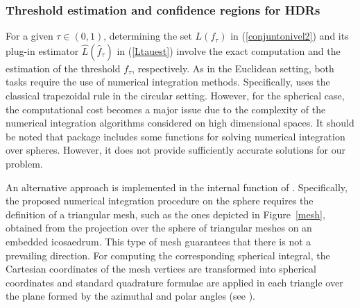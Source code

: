 \subsubsection{Threshold estimation and confidence regions for HDRs}\label{threshold}



For a given $\tau\in (0,1)$, determining the set $L(f_\tau)$ in (\ref{conjuntonivel2}) and its plug-in estimator $\hat{L}(\hat{f}_{\tau})$ in (\ref{Ltauest}) involve the exact computation and the estimation of the threshold $f_\tau$, respectively. As in the Euclidean setting, both tasks require the use of numerical integration methods. Specifically,  uses the classical trapezoidal rule in the circular setting. However, for the spherical case, the computational cost becomes a major issue due to the complexity of the numerical integration algorithms considered on high dimensional spaces. It should be noted that package  includes some functions for solving numerical integration over spheres. However, it does not provide sufficiently accurate solutions for our problem. 

An alternative approach is implemented in the internal function  of . Specifically, the proposed numerical integration procedure on the sphere requires the definition of a triangular mesh, such as the ones depicted in Figure~\ref{mesh}, obtained from the projection over the sphere of triangular meshes on an embedded icosaedrum. This type of mesh guarantees that there is not a prevailing direction. For computing the corresponding spherical integral, the Cartesian coordinates of the mesh vertices are transformed into spherical coordinates and standard quadrature formulae are applied in each triangle over the plane formed by the azimuthal and polar angles (see \citealp{strang73}).





